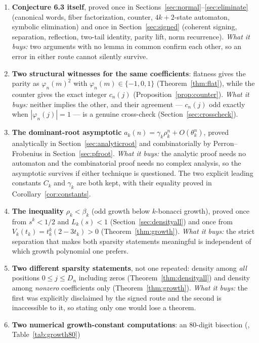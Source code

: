 \documentclass[11pt,letterpaper]{article}
\numberwithin{equation}{section}
\theoremstyle{definition}
\theoremstyle{remark}
\newcommand{\code}[1]{\texttt{\detokenize{#1}}}
\begin{document}
\begin{enumerate}[leftmargin=1.9em,label=\textbf{D\arabic*.}]
\item \textbf{Conjecture 6.3 itself}, proved once in
Sections~\ref{sec:normal}--\ref{sec:eliminate} (canonical words, fiber
factorization, counter, $4k+2$-state automaton, symbolic elimination) and
once in Section~\ref{sec:signed} (coherent signing, separation, reflection,
two-tail identity, parity lift, norm recurrence). \emph{What it buys:} two
arguments with no lemma in common confirm each other, so an error in either
route cannot silently survive.
\item \textbf{Two structural witnesses for the same coefficients}:
flatness gives the parity as $\varphi_n(m)^2$ with $\varphi_n(m)\in\{-1,0,1\}$
(Theorem~\ref{thm:flat}), while the counter gives the exact integer
$c_n(j)$ (Proposition~\ref{prop:counter}). \emph{What it buys:} neither
implies the other, and their agreement --- $c_n(j)$ odd exactly when
$|\varphi_n(j)|=1$ --- is a genuine cross-check
(Section~\ref{sec:crosscheck}).
\item \textbf{The dominant-root asymptotic} $a_k(n)=\gamma_k\rho_k^n
+O(\theta_k^n)$, proved analytically in Section~\ref{sec:analyticroot} and
combinatorially by Perron--Frobenius in Section~\ref{sec:pfroot}.
\emph{What it buys:} the analytic proof needs no automaton and the
combinatorial proof needs no complex analysis, so the asymptotic survives
if either technique is questioned. The two explicit leading constants
$C_k$ and $\gamma_k$ are both kept, with their equality proved in
Corollary~\ref{cor:constants}.
\item \textbf{The inequality} $\rho_k<\beta_k$ (odd growth below $k$-bonacci
growth), proved once from $s^k<1/2$ and $L_k(s)<1$
(Section~\ref{sec:densityall}) and once from
$V_k(t_k)=t_k^k(2-3t_k)>0$ (Theorem~\ref{thm:growth}).
\emph{What it buys:} the strict separation that makes both sparsity
statements meaningful is independent of which growth polynomial one prefers.
\item \textbf{Two different sparsity statements}, not one repeated:
density among \emph{all} positions $0\le j\le D_n$ including zeros
(Theorem~\ref{thm:densityall}) and density among \emph{nonzero}
coefficients only (Theorem~\ref{thm:growth}). \emph{What it buys:} the
first was explicitly disclaimed by the signed route and the second is
inaccessible to it, so stating only one would lose a theorem.
\item \textbf{Two numerical growth-constant computations}: an $80$-digit
\code{Decimal} bisection (\code{data/growth.csv}, Table~\ref{tab:growth80})

\end{enumerate}
\end{document}
